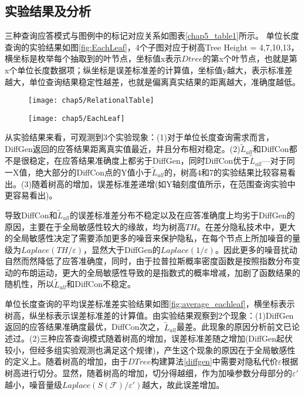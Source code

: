 \subsection{实验结果及分析}

三种查询应答模式与图例中的标记对应关系如图表\ref{chap5_table1}所示。
单位长度查询的实验结果如图\ref{fig:EachLeaf}，4个子图对应于树高Tree Height = 4,7,10,13，横坐标是枚举每个抽取到的叶节点，坐标值x表示$Dtree$的第x个叶节点，也就是第x个单位长度数据项；纵坐标是误差标准差的计算值，坐标值y越大，表示标准差越大，单位查询结果稳定性越差，也就是偏离真实结果的距离越大，准确度越低。

\begin{figure}[!htp]
	\centering
	\texttt{[image: chap5/RelationalTable]}
\end{figure}


\begin{figure}[!htp]
	\centering
	\texttt{[image: chap5/EachLeaf]}
\end{figure}

从实验结果来看，可观测到3个实验现象：(1)对于单位长度查询需求而言，DiffGen返回的应答结果距离真实值最近，并且分布相对稳定。(2)$\tilde{L}_{all}$和DiffCon都不是很稳定，在应答结果准确度上都劣于DiffGen，同时DiffCon优于$\tilde{L}_{all}$---对于同一X值，绝大部分的DiffCon点的Y值小于$\tilde{L}_{all}$的，树高4和7的实验结果比较容易看出。(3)随着树高的增加，误差标准差递增(如Y轴刻度值所示，在范围查询实验中更容易看出)。

导致DiffCon和$\tilde{L}_{all}$的误差标准差分布不稳定以及在应答准确度上均劣于DiffGen的原因，主要在于全局敏感性较大的缘故，均为树高$TH$。在差分隐私技术中，更大的全局敏感性决定了需要添加更多的噪音来保护隐私，在每个节点上所加噪音的量级为$Laplace(TH/\varepsilon)$，显然大于DiffGen的$Laplace(1/\varepsilon)$。因此更多的噪音扰动自然而然降低了应答准确度，同时，由于拉普拉斯概率密度函数是按照指数分布变动的布朗运动，更大的全局敏感性导致的是指数式的概率增减，加剧了函数结果的随机性，所以$\tilde{L}_{all}$和DiffCon不稳定。

单位长度查询的平均误差标准差实验结果如图\ref{fig:average_eachleaf}，横坐标表示树高，纵坐标表示误差标准差的计算值。由实验结果观察到2个现象：(1)DiffGen返回的应答结果准确度最优，DiffCon次之，$\tilde{L}_{all}$最差。此现象的原因分析前文已论述过。(2)三种应答查询模式随着树高的增加，误差标准差随之增加(DiffGen起伏较小，但经多组实验观测也满足这个规律)，产生这个现象的原因在于全局敏感性的定义上。随着树高的增加，由于$DTree$构建算法\ref{diffgen}中需要对隐私代价$\varepsilon$根据树高进行切分。显然，随着树高的增加，切分得越细，作为加噪参数分母部分的${\varepsilon}'$越小，噪音量级$Laplace(S(\mathcal{F})/{\varepsilon}')$越大，故此误差增加。

